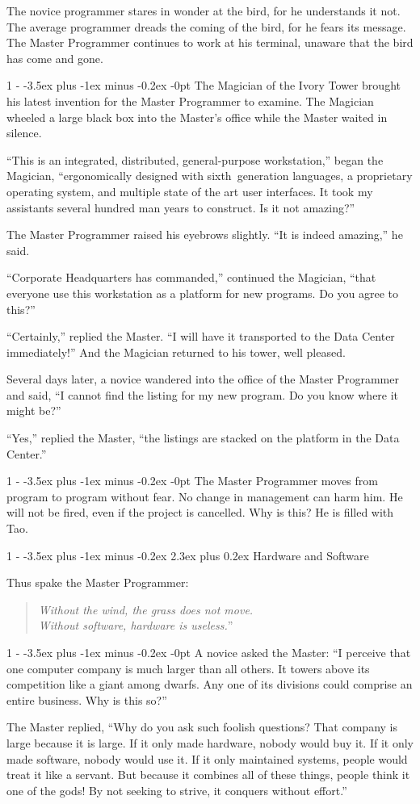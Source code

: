 \documentclass[12pt,letterpaper,titlepage]{article}
\makeatletter
\newlength{\intomargin}\setlength{\intomargin}{25pt}
\renewcommand{\section}{%
\@startsection{section}%
{1}%
{-\intomargin}%
{-3.5ex plus -1ex minus -0.2ex}%
{2.3ex plus 0.2ex}%
{\clearpage\normalfont\Large\bfseries}%
}
\renewcommand{\subsection}{%
\@startsection{subsection}%
{1}%
{-\intomargin}%
{-3.5ex plus -1ex minus -0.2ex}%
{-0pt}%
{\normalfont\normalsize\bfseries}%
}
\newcommand{\book}[2]{\section{#1}\par\hspace{-\intomargin}Thus spake the Master Programmer:%
\begin{quotation}\noindent\llap{``}\textsl{#2}''\end{quotation}\medskip}
\newcommand{\sect}{\subsection{}}
\makeatother
\begin{document}
The novice programmer stares in wonder at the bird, for he understands
it not. The average programmer dreads the coming of the bird, for he
fears its message. The Master Programmer continues to work at his
terminal, unaware that the bird has come and gone.

\sect
The Magician of the Ivory Tower brought his latest invention for the
Master Programmer to examine. The Magician wheeled a large black box
into the Master's office while the Master waited in silence.

``This is an integrated, distributed, general-purpose workstation,''
began the Magician, ``ergonomically designed with sixth~generation languages, a proprietary operating
system, and multiple state of the art user interfaces. It took my assistants several hundred man
years to construct. Is it not amazing?''

The Master Programmer raised his eyebrows slightly. ``It is indeed
amazing,'' he said.

``Corporate Headquarters has commanded,'' continued the Magician,
``that everyone use this workstation as a platform for new
programs. Do you agree to this?''

``Certainly,'' replied the Master. ``I will have it transported to the
Data Center immediately!'' And the Magician returned to his tower,
well pleased.

Several days later, a novice wandered into the office of the Master
Programmer and said, ``I cannot find the listing for my new
program. Do you know where it might be?''

``Yes,'' replied the Master, ``the listings are stacked on the
platform in the Data Center.''

\sect
The Master Programmer moves from program to program without fear. No
change in management can harm him. He will not be fired, even if the
project is cancelled. Why is this? He is filled with Tao.

\book{Hardware and Software}%
{Without the wind, the grass does not move.\\ Without software,
hardware is useless.}

\sect
A novice asked the Master: ``I perceive that one computer company is
much larger than all others. It towers above its competition like a
giant among dwarfs. Any one of its divisions could comprise an entire
business. Why is this so?''

The Master replied, ``Why do you ask such foolish questions? That
company is large because it is large. If it only made hardware, nobody
would buy it. If it only made software, nobody would use it. If it
only maintained systems, people would treat it like a servant. But
because it combines all of these things, people think it one of the
gods! By not seeking to strive, it conquers without effort.''
\end{document}
